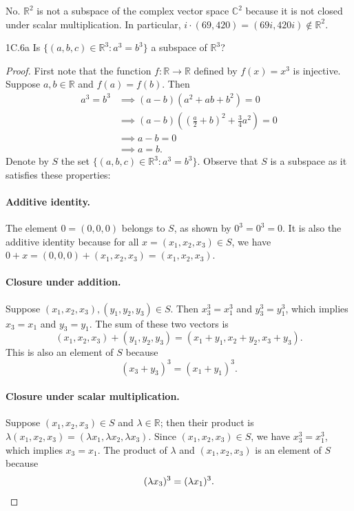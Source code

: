 \documentclass{exam}
\newcommand{\paren}[1]{\left(#1\right)}
\begin{document}
No. $\mathbb R^2$ is not a subspace of the complex vector space $\mathbb C^2$ because it is not closed under scalar multiplication. In particular, $i\cdot(69, 420) = (69i, 420i)\notin\mathbb R^2$.

\begin{problem}{1C.6a}
    Is $\{(a, b, c)\in\mathbb R^3:a^3 = b^3\}$ a subspace of $\mathbb R^3$?
\end{problem}

\begin{proof}
    First note that the function $f:\mathbb R\to\mathbb R$ defined by $f(x) = x^3$ is injective. Suppose $a, b\in\mathbb R$ and $f(a) = f(b)$. Then
    \begin{align*}
        a^3 = b^3&\implies(a-b)(a^2 + ab + b^2)=0\\
        &\implies(a-b)\paren{\paren{\frac a 2 + b}^2 + \frac34a^2} = 0\\
        &\implies a - b = 0\\
        &\implies a = b.
    \end{align*}
    Denote by $S$ the set $\{(a, b, c)\in\mathbb R^3:a^3 = b^3\}$. Observe that $S$ is a subspace as it satisfies these properties:
    \paragraph{Additive identity.} The element $0 = (0, 0, 0)$ belongs to $S$, as shown by $0^3 = 0^3 = 0$. It is also the additive identity because for all $x = (x_1, x_2, x_3)\in S$, we have $0 + x = (0, 0, 0) + (x_1, x_2, x_3) = (x_1, x_2, x_3)$.

    \paragraph{Closure under addition.} Suppose $(x_1, x_2, x_3), (y_1, y_2, y_3)\in S$. Then $x_3^3 = x_1^3$ and $y_3^3 = y_1^3$, which implies $x_3 = x_1$ and $y_3 = y_1$. The sum of these two vectors is \[
        (x_1, x_2, x_3) + (y_1, y_2, y_3) = (x_1 + y_1, x_2 + y_2, x_3 + y_3).
    \]
    This is also an element of $S$ because \[
        (x_3 + y_3)^3 = (x_1 + y_1)^3.
    \]

    \paragraph{Closure under scalar multiplication.} Suppose $(x_1, x_2, x_3)\in S$ and $\lambda\in\mathbb R$; then their product is $\lambda(x_1, x_2, x_3) = (\lambda x_1, \lambda x_2, \lambda x_3)$. Since $(x_1, x_2, x_3)\in S$, we have $x_3^3 = x_1^3$, which implies $x_3 = x_1$. The product of $\lambda$ and $(x_1, x_2, x_3)$ is an element of $S$ because \[
        (\lambda x_3)^3 = (\lambda x_1)^3. \qedhere
    \]
\end{proof}
\end{document}
